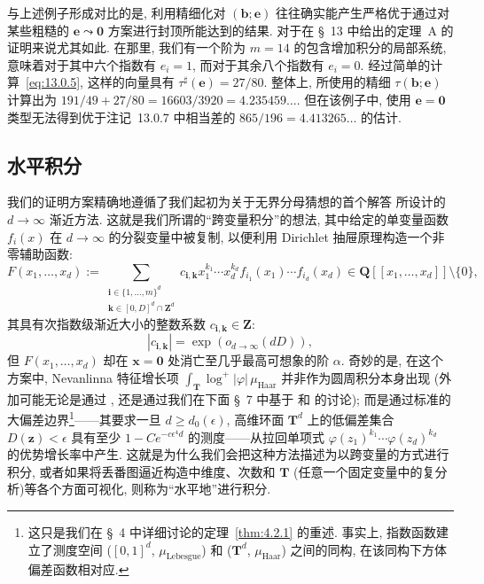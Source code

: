 与上述例子形成对比的是, 利用精细化对 $(\mathbf{b}; \mathbf{e})$ 往往确实能产生严格优于通过对某些粗糙的 $\mathbf{e} \leadsto \mathbf{0}$ 方案进行封顶所能达到的结果.
对于在 \S~13 中给出的定理~A 的证明来说尤其如此.
在那里, 我们有一个阶为 $m = 14$ 的包含增加积分的局部系统, 意味着对于其中六个指数有 $e_i = 1$, 而对于其余八个指数有 $e_i = 0$.
经过简单的计算~\eqref{eq:13.0.5}, 这样的向量具有 $\tau^{\sharp}(\mathbf{e}) = 27/80$.
整体上, 所使用的精细 $\tau(\mathbf{b}; \mathbf{e})$ 计算出为 $191/49 + 27/80 = 16603/3920 = 4.235459 \dots$.
但在该例子中, 使用 $\mathbf{e} = \mathbf{0}$ 类型无法得到优于注记~13.0.7 中相当差的 $865/196 = 4.413265 \dots$ 的估计.

\subsection{水平积分}\label{sec:6.1}
\setcounter{footnote}{19}

我们的证明方案精确地遵循了我们起初为关于无界分母猜想的首个解答 \cite[§ 2.5]{CDT21} 所设计的 $d \to \infty$ 渐近方法.
这就是我们所谓的``跨变量积分''的想法, 其中给定的单变量函数 $f_i(x)$ 在 $d \to \infty$ 的分裂变量中被复制, 以便利用 Dirichlet 抽屉原理构造一个非零辅助函数:
\begin{equation}\label{eq:6.1.1}
F(x_1, \dots, x_d) := \sum_{\substack{\mathbf{i} \in \{1, \dots, m\}^d \\ \mathbf{k} \in [0, D]^d \cap \mathbf{Z}^d}} c_{\mathbf{i}, \mathbf{k}} x_1^{k_1} \cdots x_d^{k_d} f_{i_1}(x_1) \cdots f_{i_d}(x_d) \in \mathbf{Q}[[x_1, \dots, x_d]] \setminus \{0\},
\end{equation}
其具有次指数级渐近大小的整数系数 $c_{\mathbf{i},\mathbf{k}} \in \mathbf{Z}$:
\[ |c_{\mathbf{i},\mathbf{k}}| = \exp\left(o_{d\to\infty}(dD)\right), \]
但 $F(x_1, \ldots, x_d)$ 却在 $\mathbf{x} = \mathbf{0}$ 处消亡至几乎最高可想象的阶 $\alpha$.
奇妙的是, 在这个方案中, Nevanlinna 特征增长项 $\int_{\mathbf{T}} \log^+ |\varphi| \, \mu_{\text{Haar}}$ 并非作为圆周积分本身出现 (外加可能无论是通过 \cite[§ 2.3 或 § 2.4]{CDT21}, 还是通过我们在下面 \S~7 中基于 \cite{BC22} 和 \cite{CDT24} 的讨论); 而是通过标准的大偏差边界\footnote{这只是我们在 \S~4 中详细讨论的定理~\ref{thm:4.2.1} 的重述. 事实上, 指数函数建立了测度空间 ($[0,1]^d$, $\mu_{\text{Lebesgue}}$) 和 ($\mathbf{T}^d$, $\mu_{\text{Haar}}$) 之间的同构, 在该同构下方体偏差函数相对应.}——其要求一旦 $d \ge d_0(\epsilon)$, 高维环面 $\mathbf{T}^d$ 上的低偏差集合 $D(\mathbf{z}) < \epsilon$ 具有至少 $1 - Ce^{-c\epsilon^4 d}$ 的测度——从拉回单项式 $\varphi(z_1)^{k_1} \cdots \varphi(z_d)^{k_d}$ 的优势增长率中产生.
这就是为什么我们会把这种方法描述为以跨变量的方式进行积分, 或者如果将丢番图逼近构造中维度、次数和 $\mathbf{T}$ (任意一个固定变量中的复分析)等各个方面可视化, 则称为``水平地''进行积分.

